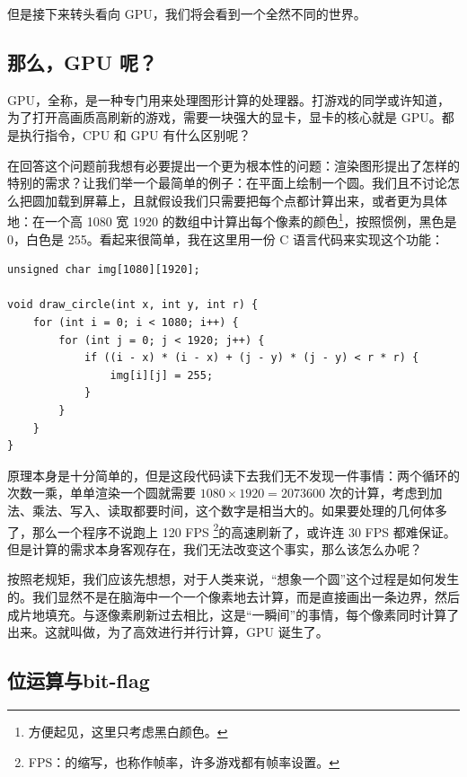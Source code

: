 但是接下来转头看向 GPU，我们将会看到一个全然不同的世界。

\newpage

\subsection{那么，GPU 呢？}

GPU，全称，是一种专门用来处理图形计算的处理器。打游戏的同学或许知道，为了打开高画质高刷新的游戏，需要一块强大的显卡，显卡的核心就是 GPU。都是执行指令，CPU 和 GPU 有什么区别呢？

在回答这个问题前我想有必要提出一个更为根本性的问题：渲染图形提出了怎样的特别的需求？让我们举一个最简单的例子：在平面上绘制一个圆。我们且不讨论怎么把圆加载到屏幕上，且就假设我们只需要把每个点都计算出来，或者更为具体地：在一个高 1080 宽 1920 的数组中计算出每个像素的颜色\footnote{方便起见，这里只考虑黑白颜色。}，按照惯例，黑色是 0，白色是 255。看起来很简单，我在这里用一份 C 语言代码来实现这个功能：
\begin{verbatim}
unsigned char img[1080][1920];

void draw_circle(int x, int y, int r) {
    for (int i = 0; i < 1080; i++) {
        for (int j = 0; j < 1920; j++) {
            if ((i - x) * (i - x) + (j - y) * (j - y) < r * r) {
                img[i][j] = 255;
            }
        }
    }
}
\end{verbatim}

原理本身是十分简单的，但是这段代码读下去我们无不发现一件事情：两个循环的次数一乘，单单渲染一个圆就需要 $1080 \times 1920 = 2073600$ 次的计算，考虑到加法、乘法、写入、读取都要时间，这个数字是相当大的。如果要处理的几何体多了，那么一个程序不说跑上 120 FPS \footnote{FPS：的缩写，也称作帧率，许多游戏都有帧率设置。}的高速刷新了，或许连 30 FPS 都难保证。但是计算的需求本身客观存在，我们无法改变这个事实，那么该怎么办呢？

按照老规矩，我们应该先想想，对于人类来说，“想象一个圆”这个过程是如何发生的。我们显然不是在脑海中一个一个像素地去计算，而是直接画出一条边界，然后成片地填充。与逐像素刷新过去相比，这是“一瞬间”的事情，每个像素同时计算了出来。这就叫做，为了高效进行并行计算，GPU 诞生了。


\subsection{位运算与bit-flag}